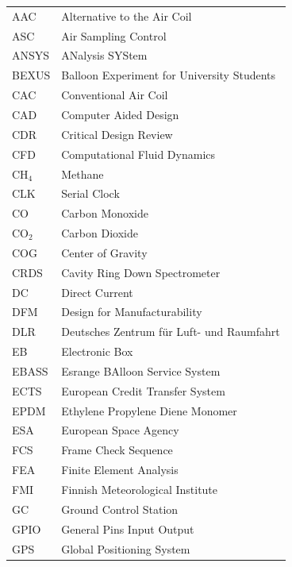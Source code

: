 \documentclass[a4paper,12pt,oneside]{article}
\begin{document}
  
    \begin{longtable}{p{3cm} p{9cm}}
            AAC         & Alternative to the Air Coil\\
            ASC         & Air Sampling Control\\
            ANSYS       & ANalysis SYStem\\
            BEXUS       & Balloon Experiment for University Students\\
            CAC         & Conventional Air Coil\\
            CAD         & Computer Aided Design \\
            CDR         & Critical Design Review\\
            CFD         & Computational Fluid Dynamics\\
            CH$_{4}$    & Methane\\
            CLK         & Serial Clock\\
            CO          & Carbon Monoxide\\
            CO$_{2}$    & Carbon Dioxide\\
            COG         & Center of Gravity \\
            CRDS        & Cavity Ring Down Spectrometer\\
            DC          & Direct Current\\
            DFM         & Design for Manufacturability \\
            DLR         & Deutsches Zentrum f{\"u}r Luft- und Raumfahrt \\
            EB          & Electronic Box \\
            EBASS       & Esrange BAlloon Service System\\
            ECTS        & European Credit Transfer System\\
            EPDM        & Ethylene Propylene Diene Monomer\\
            ESA         & European Space Agency \\
            FCS         & Frame Check Sequence\\
            FEA         & Finite Element Analysis\\
            FMI         & Finnish Meteorological Institute\\
            GC          & Ground Control Station\\
            GPIO        & General Pins Input Output\\
            GPS         & Global Positioning System\\

\end{longtable}
\end{document}
